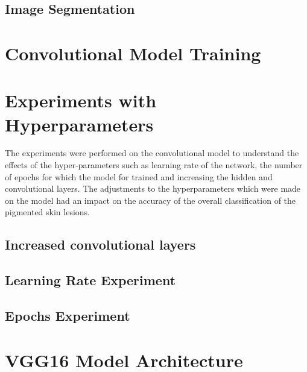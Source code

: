 \subsection{ Image Segmentation }

\pagebreak
\section{Convolutional Model Training}


\pagebreak
\section{Experiments with Hyperparameters}
The experiments were performed on the convolutional model to understand the effects of the hyper-parameters 
such as learning rate of the network, the number of epochs for which the model for trained and increasing the hidden  
and convolutional layers. The adjustments to the hyperparameters which were made on the model had an impact on the accuracy of the overall classification of the pigmented skin lesions.

\subsection{Increased convolutional layers}


\subsection{Learning Rate Experiment}


\subsection{Epochs Experiment}


\pagebreak
\section{VGG16 Model Architecture}